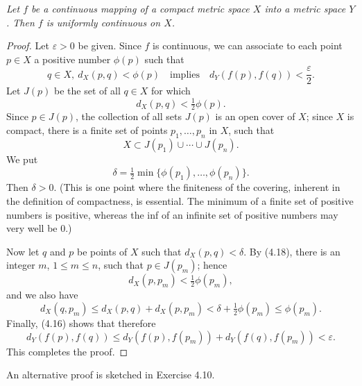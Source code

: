 \emph{Let $f$ be a continuous mapping of a compact metric space $X$ into a
metric space $Y$. Then $f$ is uniformly continuous on $X$.}

\begin{proof}
Let $\varepsilon > 0$ be given. Since $f$ is continuous, we can associate to
each point $p \in X$ a positive number $\phi(p)$ such that
\begin{equation}
  q \in X,\ d_X(p,q) < \phi(p) \quad\text{implies}\quad
  d_Y(f(p),f(q)) < \frac{\varepsilon}{2}. \tag{4.16}
\end{equation}
Let $J(p)$ be the set of all $q \in X$ for which
\begin{equation}
  d_X(p,q) < \tfrac12\phi(p). \tag{4.17}
\end{equation}
Since $p \in J(p)$, the collection of all sets $J(p)$ is an open cover of
$X$; since $X$ is compact, there is a finite set of points $p_1,\dots,p_n$ in
$X$, such that
\begin{equation}
  X \subset J(p_1) \cup \cdots \cup J(p_n). \tag{4.18}
\end{equation}
We put
\begin{equation}
  \delta = \tfrac12\min\{\phi(p_1),\dots,\phi(p_n)\}. \tag{4.19}
\end{equation}
Then $\delta > 0$. (This is one point where the finiteness of the covering,
inherent in the definition of compactness, is essential. The minimum of a
finite set of positive numbers is positive, whereas the inf of an infinite
set of positive numbers may very well be $0$.)

Now let $q$ and $p$ be points of $X$ such that $d_X(p,q) < \delta$. By
(4.18), there is an integer $m$, $1 \le m \le n$, such that $p \in J(p_m)$;
hence
\begin{equation}
  d_X(p,p_m) < \tfrac12\phi(p_m), \tag{4.20}
\end{equation}
and we also have
\[ d_X(q,p_m) \le d_X(p,q) + d_X(p,p_m)
   < \delta + \tfrac12\phi(p_m) \le \phi(p_m). \]
Finally, (4.16) shows that therefore
\[ d_Y(f(p),f(q)) \le d_Y(f(p),f(p_m)) + d_Y(f(q),f(p_m)) < \varepsilon. \]
This completes the proof.
\end{proof}

An alternative proof is sketched in Exercise 4.10.

